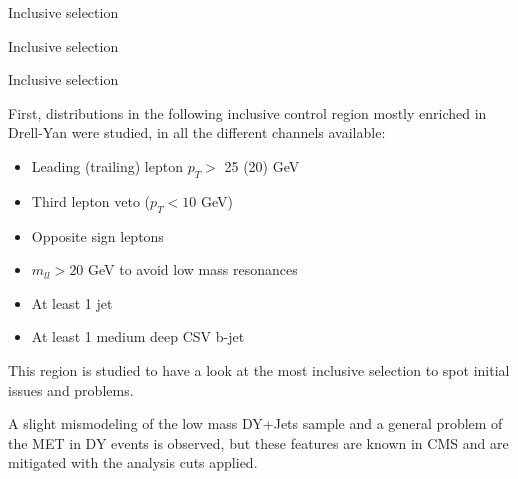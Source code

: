 \documentclass[8pt]{beamer}
\begin{document}
\begin{frame}[standout]
Inclusive selection
\end{frame}

\begin{frame}{Inclusive selection}
\justifying
\vspace{5pt}
\begin{block}{\centering Inclusive selection}\end{block} \vfill
\vspace{-5pt}

First, distributions in the following inclusive control region mostly enriched in Drell-Yan were studied, in all the different channels available:
\begin{itemize}
\item Leading (trailing) lepton $p_T >$ 25 (20) GeV
\item Third lepton veto ($p_T < 10$ GeV)
\item Opposite sign leptons
\item $m_{ll} > 20$ GeV to avoid low mass resonances
\item At least 1 jet
\item At least 1 medium deep CSV b-jet
\end{itemize} \vfill

This region is studied to have a look at the most inclusive selection to spot initial issues and problems. \vfill

A slight mismodeling of the low mass DY+Jets sample and a general problem of the MET in DY events is observed, but these features are known in CMS and are mitigated with the analysis cuts applied. \vfill
\end{frame}
\end{document}
